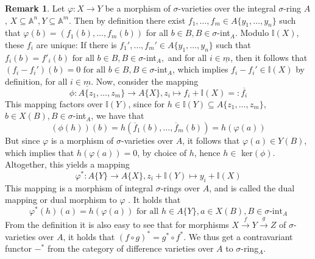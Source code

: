 \documentclass{article}
\def\I{\mathbb{I}}
\def\s{\sigma}
\def\fa{\text{ for all }}
\theoremstyle{definition}
\newtheorem{rem}[Satz]{Remark}
\begin{document}
\begin{rem}\label{dualmor}
Let $\varphi: X \rightarrow Y$ be a morphism of $\s$-varieties over the integral $\s$-ring $A$, $X \subseteq \mathbb{A}^n, Y \subseteq \mathbb{A}^m$. Then by definition there exist $f_1, \ldots, f_m \in A\{y_1,\ldots,y_n\}$ such 
that $\varphi(b) = (f_1(b),\ldots,f_m(b))$ for all $b \in B, B \in \s$-int$_A$. Modulo $\I(X)$, these $f_i$ are unique:
 If there is $f_1', \ldots, f_m' \in A\{y_1,\ldots,y_n\}$ such that $f_i(b) = f'_i(b) \fa b \in B, B \in \s$-int$_A,$ and for all $i \in \underline{m}$,
then it follows that $(f_i - f_i')(b) = 0 \fa b \in B, B \in \s$-int$_A$, which implies $f_i - f_i' \in \I(X)$ by definition, for all $i \in \underline{m}$.
Now, consider the mapping \[ \phi: A\{z_1,\ldots,z_m \} \rightarrow A\{X\}, z_i \mapsto f_i + \I(X) =: \overline{f_i} \]
This mapping factors over $\I(Y)$, since for $h \in \I(Y) \subseteq A\{z_1,\ldots,z_m\}$, $b \in X(B), B \in \s$-int$_A$, we have that 
\[ (\phi(h))(b) = h(\overline f_1(b), \ldots, \overline f_m(b)) = h(\varphi(a)) \]
But since $\varphi$ is a morphism of $\s$-varieties over $A$, it follows that $\varphi(a) \in Y(B)$, which implies that $h(\varphi(a)) = 0$, by choice of $h$, hence $h \in $ ker$(\phi)$.
Altogether, this yields a mapping 
\[ \varphi^* : A\{Y\} \rightarrow A\{X\}, z_i + \I(Y) \mapsto y_i + \I(X) \]
This mapping is a morphism of integral $\s$-rings over $A$, and is called the dual mapping or dual morphism to $\varphi$ . It holds that
\[ \varphi^*(h)(a) = h(\varphi(a)) \fa h \in A\{Y\}, a \in X(B), B \in \s\text{-int}_A \]
From the definition it is also easy to see that for morphisms $X \xrightarrow{f} Y \xrightarrow{g} Z$ of $\s$-varieties over $A$, it holds that $ (f \circ g)^* = g^* \circ f^*$. 
We thus get a contravariant functor $-^*$ from the category of difference varieties over $A$ to $\s$-ring$_A$.
\end{rem}
\end{document}
